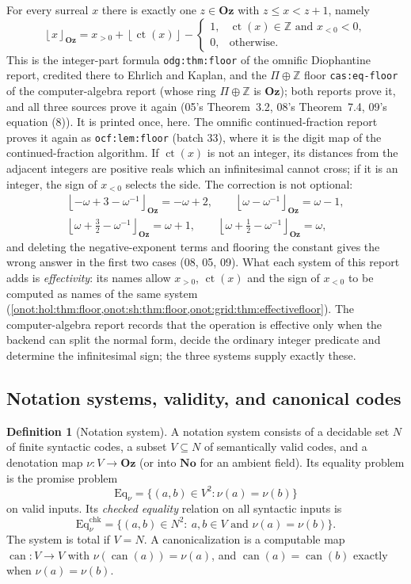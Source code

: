 \documentclass[11pt,oneside]{article}
\numberwithin{equation}{section}
\theoremstyle{definition}
\newtheorem{definition}[definition]{Definition}
\theoremstyle{remark}
\newcommand{\No}{\mathbf{No}}
\newcommand{\Oz}{\mathbf{Oz}}
\newcommand{\Z}{\mathbb Z}
\newcommand{\ct}{\operatorname{ct}}
\newcommand{\can}{\operatorname{can}}
\newcommand{\Eq}{\mathrm{Eq}}
\newcommand{\fl}[1]{\left\lfloor #1\right\rfloor_{\Oz}}
\newcommand{\floor}[1]{\left\lfloor #1\right\rfloor}
\newcommand{\replabel}[1]{\nolinkurl{#1}}
\begin{document}
For every surreal $x$ there is exactly one $z\in\Oz$ with $z\le x<z+1$, namely
\begin{equation}\label{onot:eq:floor}
 \fl{x}=x_{>0}+\floor{\ct(x)}-
 \begin{cases}
 1,&\ct(x)\in\Z\text{ and }x_{<0}<0,\\
 0,&\text{otherwise.}
 \end{cases}
\end{equation}
This is the integer-part formula \replabel{odg:thm:floor} of the omnific
Diophantine report, credited there to Ehrlich and Kaplan, and the
$\Pi\oplus\Z$ floor \replabel{cas:eq-floor} of the computer-algebra report
(whose ring $\Pi\oplus\Z$ is $\Oz$); both reports prove it, and all three sources
prove it again (05's Theorem~3.2, 08's Theorem~7.4, 09's equation (8)). It is
printed once, here. The omnific continued-fraction report proves it again as
\replabel{ocf:lem:floor} (batch 33), where it is the digit map of the
continued-fraction algorithm. If $\ct(x)$ is not an integer, its distances from the
adjacent integers are positive reals which an infinitesimal cannot cross; if it
is an integer, the sign of $x_{<0}$ selects the side. The correction is not
optional:
\begin{gather*}
 \fl{-\omega+3-\omega^{-1}}=-\omega+2,\qquad
 \fl{\omega-\omega^{-1}}=\omega-1,\\
 \fl{\omega+\tfrac32-\omega^{-1}}=\omega+1,\qquad
 \fl{\omega+\tfrac12-\omega^{-1}}=\omega,
\end{gather*}
and deleting the negative-exponent terms and flooring the constant gives the
wrong answer in the first two cases (08, 05, 09). What each system of this report
adds is \emph{effectivity}: its names allow $x_{>0}$, $\ct(x)$ and the sign of
$x_{<0}$ to be computed as names of the same system
(\cref{onot:hol:thm:floor,onot:sh:thm:floor,onot:grid:thm:effectivefloor}).
The computer-algebra report records that the operation is effective only when
the backend can split the normal form, decide the ordinary integer predicate
and determine the infinitesimal sign; the three systems supply exactly these.

\subsection{Notation systems, validity, and canonical codes}

\begin{definition}[Notation system]\label{onot:def:notation}
A notation system consists of a decidable set $N$ of finite syntactic codes, a
subset $V\subseteq N$ of semantically valid codes, and a denotation map
$\nu:V\to\Oz$ (or into $\No$ for an ambient field). Its equality problem is
the promise problem
\[
 \Eq_\nu=\{(a,b)\in V^2:\nu(a)=\nu(b)\}
\]
on valid inputs. Its \emph{checked equality} relation on all syntactic inputs is
\[
 \Eq^{\mathrm{chk}}_\nu=\{(a,b)\in N^2:\ a,b\in V\text{ and }\nu(a)=\nu(b)\}.
\]
The system is total if $V=N$. A canonicalization is a computable map
$\can:V\to V$ with $\nu(\can(a))=\nu(a)$, and $\can(a)=\can(b)$ exactly when
$\nu(a)=\nu(b)$.
\end{definition}
\end{document}
